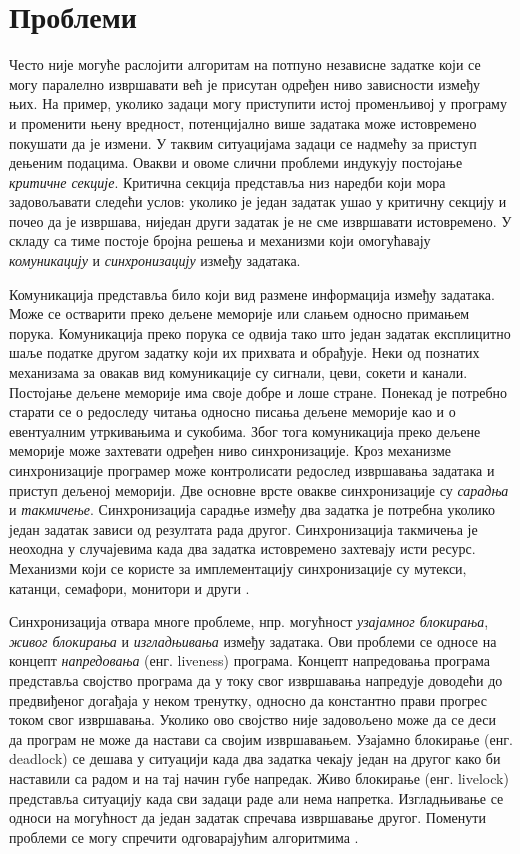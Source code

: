 \documentclass[12pt,oneside]{memoir}
\begin{document}
  \section{Проблеми}
  Често није могуће раслојити алгоритам на потпуно независне задатке који се могу паралелно извршавати већ је присутан одређен ниво зависности између њих. На пример, уколико задаци могу приступити истој променљивој у програму и променити њену вредност, потенцијално више задатака може истовремено покушати да је измени. У таквим ситуацијама задаци се надмећу за приступ дењеним подацима.  Овакви и овоме слични проблеми индукују постојање \emph{критичне секције}. Критична секција представља низ наредби који мора задовољавати следећи услов: уколико је један задатак ушао у критичну секцију и почео да је извршава, ниједан други задатак је не сме извршавати истовремено. У складу са тиме постоје бројна решења и механизми који омогућавају \emph{комуникацију} и  \emph{синхронизацију} између задатака.
  
  
Комуникација представља било који вид размене информација између задатака. Може се остварити преко дељене меморије или слањем односно примањем порука. Комуникација преко порука се одвија тако што један задатак експлицитно шаље податке другом задатку који их прихвата и обрађује. Неки од познатих механизама за овакав вид комуникације су сигнали, цеви, сокети и канали.
Постојање дељене меморије има своје добре и лоше стране. Понекад је потребно старати се о редоследу читања односно писања дељене меморије као и о евентуалним утркивањима и сукобима. Због тога комуникација преко дељене меморије може захтевати одређен ниво синхронизације. Кроз механизме синхронизације програмер може контролисати редослед извршавања задатака и приступ дељеној меморији. Две основне врсте овакве синхронизације су \emph{сарадња} и \emph{такмичење}. Синхронизација сарадње између два задатка је потребна уколико један задатак зависи од резултата рада другог. Синхронизација такмичења је неоходна у случајевима када два задатка истовремено захтевају исти ресурс. Механизми који се користе за имплементацију синхронизације су мутекси, катанци, семафори, монитори и други \cite{lang_prag}.

 Синхронизација отвара многе проблеме, нпр. могућност \emph{узајамног блокирања}, \emph{живог блокирања} и \emph{изгладњивања} између задатака. Ови проблеми се односе на концепт \emph{напредовања} (енг. liveness) програма. Концепт напредовања програма представља својство програма да у току свог извршавања напредује доводећи до предвиђеног догађаја у неком тренутку, односно да константно прави прогрес током свог извршавања. Уколико ово својство није задовољено може да се деси да програм не може да настави са својим извршавањем. Узајамно блокирање (енг. deadlock) се дешава у ситуацији када два задатка чекају један на другог како би наставили са радом и на тај начин губе напредак. Живо блокирање (енг. livelock) представља ситуацију када сви задаци раде али нема напретка. Изгладњивање се односи на могућност да један задатак спречава извршавање другог. Поменути проблеми се могу спречити одговарајућим алгоритмима \cite{opsis}.
\end{document}
